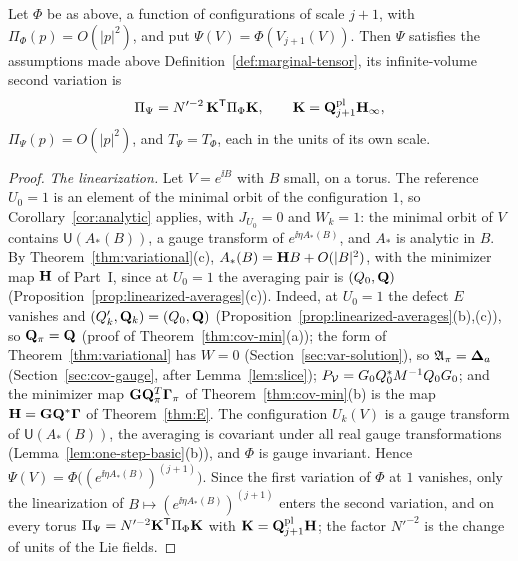 \begin{lemma}\label{lem:ol-pullback}
Let $\Phi$ be as above, a function of configurations of scale $j+1$, with $\Pi_\Phi(p)=O(|p|^2)$, and put $\Psi(V)=\Phi(V_{j+1}(V))$. Then $\Psi$ satisfies the assumptions made above Definition~\ref{def:marginal-tensor}, its infinite-volume second variation is
\[
\Pi_\Psi=N'^{-2}\,\mathbf K^{\sf T}\Pi_\Phi\mathbf K,\qquad\mathbf K=\mathbf Q^{\rm pl}_{j+1}\mathbf H_\infty ,
\]
$\Pi_\Psi(p)=O(|p|^2)$, and $T_\Psi=T_\Phi$, each in the units of its own scale.
\end{lemma}

\begin{proof}
\emph{The linearization.} Let $V=e^{\ii B}$ with $B$ small, on a torus. The reference $U_0=1$ is an element of the minimal orbit of the configuration $1$, so Corollary~\ref{cor:analytic} applies, with $J_{U_0}=0$ and $W_k=1$: the minimal orbit of $V$ contains $\mathsf U(A_*(B))$, a gauge transform of $e^{\ii\eta A_*(B)}$, and $A_*$ is analytic in $B$. By Theorem~\ref{thm:variational}(c), $A_*(B)=\mathbf H B+O(|B|^2)$, with the minimizer map $\mathbf H$ of Part~I, since at $U_0=1$ the averaging pair is $(Q_0,\mathbf Q)$ (Proposition~\ref{prop:linearized-averages}(c)). Indeed, at $U_0=1$ the defect $E$ vanishes and $(Q'_k,\mathbf Q_k)=(Q_0,\mathbf Q)$ (Proposition~\ref{prop:linearized-averages}(b),(c)), so $\mathbf Q_\pi=\mathbf Q$ (proof of Theorem~\ref{thm:cov-min}(a)); the form of Theorem~\ref{thm:variational} has $W=0$ (Section~\ref{sec:var-solution}), so $\mathfrak A_\pi=\boldsymbol{\Delta}_a$ (Section~\ref{sec:cov-gauge}, after Lemma~\ref{lem:slice}); $P_\mathcal V=G_0Q_0^*M^{-1}Q_0G_0$; and the minimizer map $\mathbf G\mathbf Q_\pi^T\boldsymbol\Gamma_\pi$ of Theorem~\ref{thm:cov-min}(b) is the map $\mathbf H=\mathbf G\mathbf Q^*\boldsymbol\Gamma$ of Theorem~\ref{thm:E}. The configuration $U_k(V)$ is a gauge transform of $\mathsf U(A_*(B))$, the averaging is covariant under all real gauge transformations (Lemma~\ref{lem:one-step-basic}(b)), and $\Phi$ is gauge invariant. Hence $\Psi(V)=\Phi\big((e^{\ii\eta A_*(B)})^{(j+1)}\big)$. Since the first variation of $\Phi$ at $1$ vanishes, only the linearization of $B\mapsto(e^{\ii\eta A_*(B)})^{(j+1)}$ enters the second variation, and on every torus $\Pi_\Psi=N'^{-2}\mathbf K^{\sf T}\Pi_\Phi\mathbf K$ with $\mathbf K=\mathbf Q^{\rm pl}_{j+1}\mathbf H$; the factor $N'^{-2}$ is the change of units of the Lie fields.


\end{proof}
